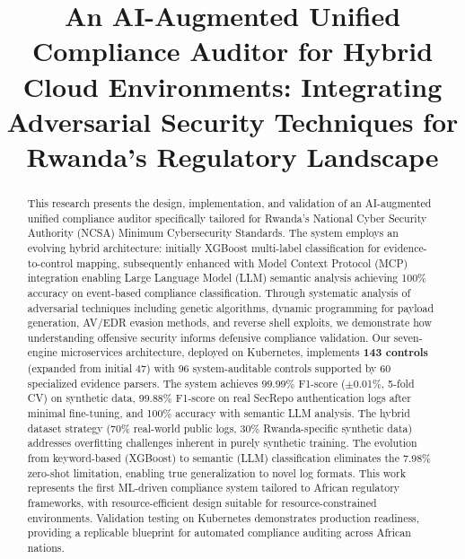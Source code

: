 \documentclass[11pt,conference]{IEEEtran}
\begin{document}
\title{An AI-Augmented Unified Compliance Auditor for Hybrid Cloud Environments: Integrating Adversarial Security Techniques for Rwanda's Regulatory Landscape}

\author{
}

\maketitle

\begin{abstract}
This research presents the design, implementation, and validation of an AI-augmented unified compliance auditor specifically tailored for Rwanda's National Cyber Security Authority (NCSA) Minimum Cybersecurity Standards. The system employs an evolving hybrid architecture: initially XGBoost multi-label classification for evidence-to-control mapping, subsequently enhanced with Model Context Protocol (MCP) integration enabling Large Language Model (LLM) semantic analysis achieving 100\% accuracy on event-based compliance classification. Through systematic analysis of adversarial techniques including genetic algorithms, dynamic programming for payload generation, AV/EDR evasion methods, and reverse shell exploits, we demonstrate how understanding offensive security informs defensive compliance validation. Our seven-engine microservices architecture, deployed on Kubernetes, implements \textbf{143 controls} (expanded from initial 47) with 96 system-auditable controls supported by 60 specialized evidence parsers. The system achieves 99.99\% F1-score ($\pm$0.01\%, 5-fold CV) on synthetic data, 99.88\% F1-score on real SecRepo authentication logs after minimal fine-tuning, and 100\% accuracy with semantic LLM analysis. The hybrid dataset strategy (70\% real-world public logs, 30\% Rwanda-specific synthetic data) addresses overfitting challenges inherent in purely synthetic training. The evolution from keyword-based (XGBoost) to semantic (LLM) classification eliminates the 7.98\% zero-shot limitation, enabling true generalization to novel log formats. This work represents the first ML-driven compliance system tailored to African regulatory frameworks, with resource-efficient design suitable for resource-constrained environments. Validation testing on Kubernetes demonstrates production readiness, providing a replicable blueprint for automated compliance auditing across African nations.
\end{abstract}
\end{document}
